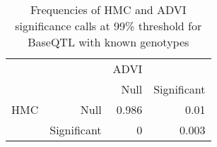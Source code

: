 \begin{table}[ht]
\centering
\caption{Frequencies of HMC and ADVI significance calls at 99\% threshold for BaseQTL with known genotypes} 
\label{tab:GT-xtab-prop-99}
\begin{tabular}{rr|rr}
   &  & ADVI &  \\ 
    &   & Null & Significant \\ 
   \hline
HMC & Null & 0.986 & 0.01 \\ 
    & Significant & 0 & 0.003 \\ 
  \end{tabular}
\end{table}
